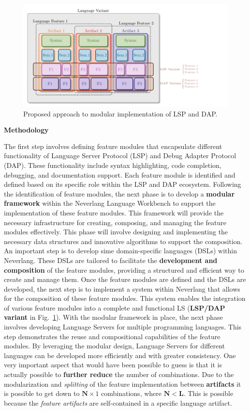 \begin{figure}[t]
    \centering
    \includegraphics[width=1\linewidth]{figs/module_with_lsp.pdf}
    \caption{Proposed approach to modular implementation of LSP and DAP.}
    \label{fig:proposed}
\end{figure}

\hfill \break
\noindent
\textbf{Methodology}

The first step involves defining feature modules that encapsulate different functionality of Language Server Protocol (LSP) and Debug Adapter Protocol (DAP). These functionality include syntax highlighting, code completion, debugging, and documentation support. Each feature module is identified and defined based on its specific role within the LSP and DAP ecosystem. Following the identification of feature modules, the next phase is to develop a \textbf{modular framework} within the Neverlang Language Workbench to support the implementation of these feature modules. This framework will provide the necessary infrastructure for creating, composing, and managing the feature modules effectively. This phase will involve designing and implementing the necessary data structures and innovative algorithms to support the composition.
An important step is to develop sime domain-specific languages (DSLs) within Neverlang. These DSLs are tailored to facilitate the \textbf{development and composition} of the feature modules, providing a structured and efficient way to create and manage them. Once the feature modules are defined and the DSLs are developed, the next step is to implement a system within Neverlang that allows for the composition of these feature modules. This system enables the integration of various feature modules into a complete and functional LS (\textbf{LSP/DAP variant} in Fig.~\ref{fig:proposed}). With the modular framework in place, the next phase involves developing Language Servers for multiple programming languages. This step demonstrates the reuse and compositional capabilities of the feature modules. By leveraging the modular design, Language Servers for different languages can be developed more efficiently and with greater consistency.
One very important aspect that would have been possible to guess is that it is actually possible to \textbf{further reduce} the number of combinations. Due to the modularization and \textit{splitting} of the feature implementation between \textbf{artifacts} it is possible to get down to $\mathbf{N} \times 1$ combinations, where $\mathbf{N} < \mathbf{L}$. This is possible because the \textit{feature artifacts} are self-contained in a specific language artifact.

